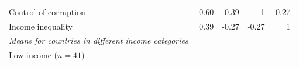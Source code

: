 \documentclass[11pt,a4paper,openany]{book}
\begin{document}
\begin{longtable}[]{@{}lrrrr@{}}
\begin{minipage}[t]{0.41\columnwidth}
Control of corruption\strut
\end{minipage} & \begin{minipage}[t]{0.20\columnwidth}\raggedleft\strut
-0.60\strut
\end{minipage} & \begin{minipage}[t]{0.07\columnwidth}\raggedleft\strut
0.39\strut
\end{minipage} & \begin{minipage}[t]{0.08\columnwidth}\raggedleft\strut
1\strut
\end{minipage} & \begin{minipage}[t]{0.08\columnwidth}\raggedleft\strut
-0.27\strut
\end{minipage}\tabularnewline
\begin{minipage}[t]{0.41\columnwidth}\raggedright\strut
Income inequality\strut
\end{minipage} & \begin{minipage}[t]{0.20\columnwidth}\raggedleft\strut
0.39\strut
\end{minipage} & \begin{minipage}[t]{0.07\columnwidth}\raggedleft\strut
-0.27\strut
\end{minipage} & \begin{minipage}[t]{0.08\columnwidth}\raggedleft\strut
-0.27\strut
\end{minipage} & \begin{minipage}[t]{0.08\columnwidth}\raggedleft\strut
1\strut
\end{minipage}\tabularnewline
\begin{minipage}[t]{0.41\columnwidth}\raggedright\strut
\emph{Means for countries in different income categories}\strut
\end{minipage} & \begin{minipage}[t]{0.20\columnwidth}\raggedleft\strut
\strut
\end{minipage} & \begin{minipage}[t]{0.07\columnwidth}\raggedleft\strut
\strut
\end{minipage} & \begin{minipage}[t]{0.08\columnwidth}\raggedleft\strut
\strut
\end{minipage} & \begin{minipage}[t]{0.08\columnwidth}\raggedleft\strut
\strut
\end{minipage}\tabularnewline
\begin{minipage}[t]{0.41\columnwidth}\raggedright\strut
Low income (\(n=41\))\strut
\end{minipage} & \begin{minipage}[t]{0.20\columnwidth}\raggedleft\strut

\end{minipage}
\end{longtable}
\end{document}
